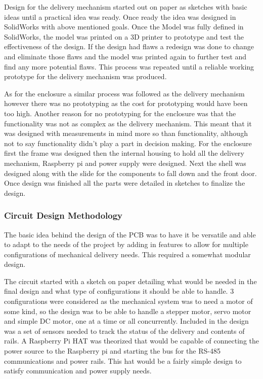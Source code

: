 \documentclass[a4paper,11pt]{article}
\numberwithin{figure}{subsection}
\begin{document}
Design for the delivery mechanism started out on paper as sketches with basic ideas until a practical idea was ready. Once ready the idea was designed in SolidWorks with above mentioned goals. Once the Model was fully defined in SolidWorks, the model was printed on a 3D printer to prototype and test the effectiveness of the design. If the design had flaws a redesign was done to change and eliminate those flaws and the model was printed again to further test and find any more potential flaws. This process was repeated until a reliable working prototype for the delivery mechanism was produced.

As for the enclosure a similar process was followed as the delivery mechanism however there was no prototyping as the cost for prototyping would have been too high. Another reason for no prototyping for the enclosure was that the functionality was not as complex as the delivery mechanism. This meant that it was designed with measurements in mind more so than functionality, although not to say functionality didn't play a part in decision making. For the enclosure first the frame was designed then the internal housing to hold all the delivery mechanism, Raspberry pi and power supply were designed. Next the shell was designed along with the slide for the components to fall down and the front door. Once design was finished all the parts were detailed in sketches to finalize the design.

\subsubsection{Circuit Design Methodology}
The basic idea behind the design of the PCB was to have it be versatile and able to adapt to the needs of the project by adding in features to allow for multiple configurations of mechanical delivery needs. This required a somewhat modular design.

The circuit started with a sketch on paper detailing what would be needed in the final design and what type of configurations it should be able to handle. 3 configurations were considered as the mechanical system was to need a motor of some kind, so the design was to be able to handle a stepper motor, servo motor and simple DC motor, one at a time or all concurrently. Included in the design was a set of sensors needed to track the status of the delivery and contents of rails.
A Raspberry Pi HAT was theorized that would be capable of connecting the power source to the Raspberry pi and starting the bus for the RS-485 communications and power rails. This hat would be a fairly simple design to satisfy communication and power supply needs.
\end{document}
